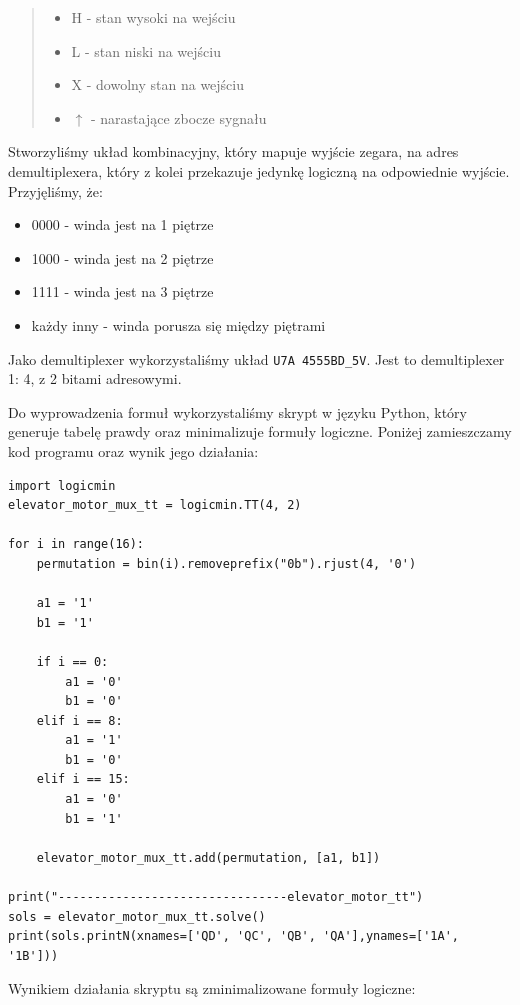 \documentclass[a4paper]{article}
\begin{document}
\begin{abstract}
    \noindent \begin{itemize}
        \item H - stan wysoki na wejściu
        \item L - stan niski na wejściu
        \item X - dowolny stan na wejściu
        \item $\uparrow$ - narastające zbocze sygnału
    \end{itemize}
\end{abstract}
Stworzyliśmy układ kombinacyjny, który mapuje wyjście zegara, na adres demultiplexera, który 
z kolei przekazuje jedynkę logiczną na odpowiednie wyjście. 
Przyjęliśmy, że:
\begin{itemize}
    \item 0000 - winda jest na 1 piętrze
    \item 1000 - winda jest na 2 piętrze
    \item 1111 - winda jest na 3 piętrze
    \item każdy inny - winda porusza się między piętrami
\end{itemize}
Jako demultiplexer wykorzystaliśmy układ \verb|U7A 4555BD_5V|. Jest to demultiplexer 1: 4, z 2 
bitami adresowymi.

Do wyprowadzenia formuł wykorzystaliśmy skrypt w języku Python, który generuje tabelę prawdy oraz
minimalizuje formuły logiczne. Poniżej zamieszczamy kod programu oraz wynik jego działania:
\begin{verbatim}
import logicmin
elevator_motor_mux_tt = logicmin.TT(4, 2)

for i in range(16):
    permutation = bin(i).removeprefix("0b").rjust(4, '0')
    
    a1 = '1'
    b1 = '1'

    if i == 0:
        a1 = '0'
        b1 = '0'
    elif i == 8:
        a1 = '1'
        b1 = '0'
    elif i == 15:
        a1 = '0'
        b1 = '1'

    elevator_motor_mux_tt.add(permutation, [a1, b1])

print("--------------------------------elevator_motor_tt")
sols = elevator_motor_mux_tt.solve()
print(sols.printN(xnames=['QD', 'QC', 'QB', 'QA'],ynames=['1A', '1B']))
\end{verbatim}
Wynikiem działania skryptu są zminimalizowane formuły logiczne:
\end{document}
